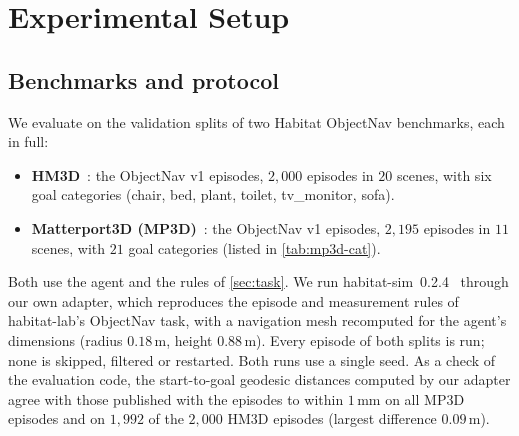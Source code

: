 \documentclass[10pt]{article}
\newcommand{\m}{\,\mathrm{m}}
\begin{document}
\section{Experimental Setup}\label{sec:experiments}

\subsection{Benchmarks and protocol}\label{sec:experiments-benchmarks}
We evaluate on the validation splits of two Habitat ObjectNav benchmarks, each
in full:
\begin{itemize}[leftmargin=*,itemsep=1pt,topsep=2pt]
  \item \textbf{HM3D}~\citep{ramakrishnan2021habitat,yadav2023habitat}: the
        ObjectNav v1 episodes, $2{,}000$ episodes in $20$ scenes, with six
        goal categories (chair, bed, plant, toilet, tv\_monitor, sofa).
  \item \textbf{Matterport3D (MP3D)}~\citep{chang2017matterport3d}: the
        ObjectNav v1 episodes, $2{,}195$ episodes in $11$ scenes, with $21$
        goal categories (listed in \cref{tab:mp3d-cat}).
\end{itemize}
Both use the agent and the rules of \cref{sec:task}. We run
habitat-sim~0.2.4~\citep{savva2019habitat,szot2021habitat} through our own
adapter, which reproduces the episode and measurement rules of habitat-lab's
ObjectNav task, with a navigation mesh recomputed for the agent's dimensions
(radius $0.18\m$, height $0.88\m$). Every episode of
both splits is run; none is skipped, filtered or restarted. Both runs use a
single seed. As a check of the evaluation code, the start-to-goal geodesic
distances computed by our adapter agree with those published with the episodes
to within $1$\,mm on all MP3D episodes and on $1{,}992$ of the $2{,}000$ HM3D
episodes (largest difference $0.09\m$).
\end{document}
